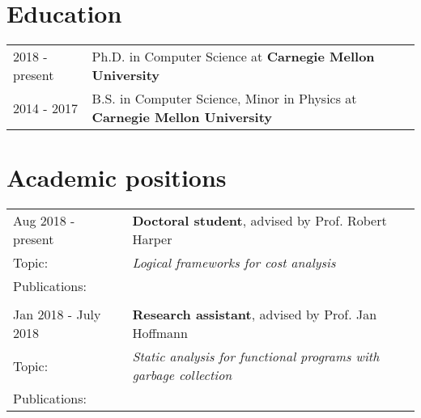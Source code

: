 \documentclass[a4paper,12pt]{article}
\begin{document}


\section{Education}
\begin{tabularx}{\linewidth}{@{}l X@{}}	
2018 - present & Ph.D. in Computer Science at \textbf{Carnegie Mellon University} \hfill \normalsize \\

2014 - 2017 & B.S. in Computer Science, Minor in Physics at \textbf{Carnegie Mellon University} \hfill 
\end{tabularx}

\section{Academic positions}

\begin{tabularx}{\linewidth}{ @{}l X@{} }
  Aug 2018 - present & \textbf{Doctoral student}, advised by Prof. Robert Harper \\[3.75pt]
  Topic: & \emph{Logical frameworks for cost analysis}\\
  Publications: &\citet{niu-harper:2022,niu-sterling-grodin-harper:2022,grodin2023decalf}\\ \\ 
  Jan 2018 - July 2018 & \textbf{Research assistant}, advised by Prof. Jan Hoffmann \\[3.75pt]
  Topic: & \emph{Static analysis for functional programs with garbage collection}\\ 
  Publications: & \citet{niu-hoffmann:2018}
\end{tabularx}
\end{document}

